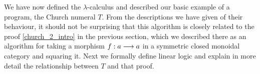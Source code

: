 \documentclass[english,letter paper,12pt,reqno]{article}
\theoremstyle{example}
\newtheorem{question}[theorem]{Question}
\numberwithin{equation}{section}
\begin{document}

We have now defined the $\lambda$-calculus and described our basic example of a program, the Church numeral $T$. From the descriptions we have given of their behaviour, it should not be surprising that this algorithm is closely related to the proof \eqref{church_2_intro} in the previous section, which we described there as an algorithm for taking a morphism $f: a \longrightarrow a$ in a symmetric closed monoidal category and squaring it. Next we formally define linear logic and explain in more detail the relationship between $T$ and that proof.




\end{document}
